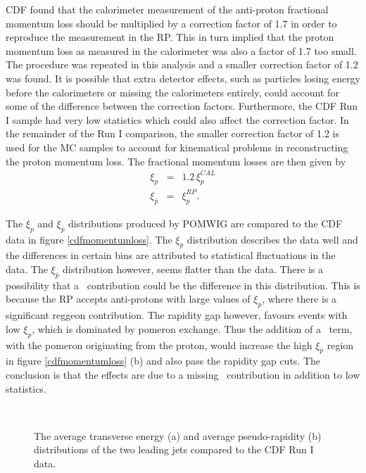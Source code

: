 CDF found that the calorimeter measurement of the anti-proton fractional momentum loss should be multiplied by a correction factor of 1.7 in order to reproduce the measurement in the RP. This in turn implied that the proton momentum loss as measured in the calorimeter was also a factor of 1.7 too small. The procedure was repeated in this analysis and a smaller correction factor of 1.2 was found. It is possible that extra detector effects, such as particles losing energy before the calorimeters or missing the calorimeters entirely, could account for some of the difference between the correction factors. Furthermore, the CDF Run I sample had very low statistics which could also affect the correction factor. In the remainder of the Run I comparison, the smaller correction factor of 1.2 is used for the MC samples to account for kinematical problems in reconstructing the proton momentum loss. The fractional momentum losses are then given by
\begin{eqnarray}
\xi_{p} & = & 1.2 \, \xi_{p}^{CAL} \\
\xi_{\bar{p}} & = & \xi_{\bar{p}}^{RP}.
\end{eqnarray}

The $\xi_p$ and $\xi_{\bar{p}}$ distributions produced by POMWIG are compared to the CDF data in figure \ref{cdfmomentumloss}.  The $\xi_p$ distribution describes the data well and the differences in certain bins are attributed to statistical fluctuations in the data. The $\xi_{\bar{p}}$ distribution however, seems flatter than the data. There is a possibility that a \Pom \Reg \, contribution could be the difference in this distribution. This is because the RP accepts anti-protons with large values of $\xi_{\bar{p}}$, where there is a significant reggeon contribution. The rapidity gap however, favours events with low $\xi_p$, which is dominated by pomeron exchange. Thus the addition of a \Pom \Reg \, term, with the pomeron originating from the proton, would increase the high $\xi_{\bar{p}}$ region in figure \ref{cdfmomentumloss} (b) and also pass the rapidity gap cuts. The conclusion is that the effects are due to a missing \Pom \Reg \, contribution in addition to low statistics.

\begin{figure} [t]
\centering
	\mbox{
	}
\caption[The event generator average jet pseudo-rapidity and transverse energy distributions compared to CDF Run I data]{The average transverse energy (a) and average pseudo-rapidity (b) distributions of the two leading jets compared to the CDF Run I data. \label{cdfjetvars}}
\end{figure}


